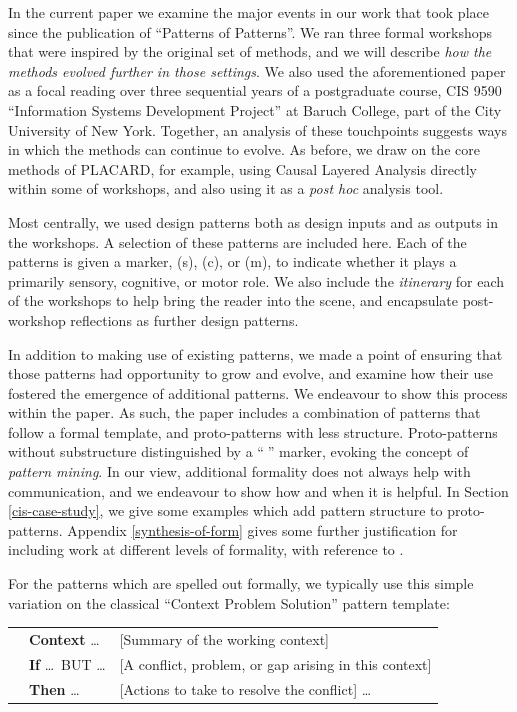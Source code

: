 \documentclass[acmlarge,timestamp]{acmart}
\begin{document}
In the current paper we examine the major events in our work that took
place since the publication of “Patterns of Patterns”.  We ran three
formal workshops that were inspired by the original set of methods,
and we will describe \emph{how the methods evolved further in those
settings}.  We also used the aforementioned paper as a focal reading
over three sequential years of a postgraduate course, CIS 9590
“Information Systems Development Project” at Baruch College, part of
the City University of New York.  Together, an analysis of these
touchpoints suggests ways in which the methods can continue to evolve.
As before, we draw on the core methods of PLACARD, for example, using
Causal Layered Analysis directly within some of workshops, and also
using it as a \emph{post hoc} analysis tool.

Most centrally, we used design patterns both as design inputs and as
outputs in the workshops.  A selection of these patterns are included
here.  Each of the patterns is given a marker, (s), (c), or (m), to
indicate whether it plays a primarily sensory, cognitive, or motor
role.  We also include the \emph{itinerary} for each of the workshops
to help bring the reader into the scene, and encapsulate post-workshop
reflections as further design patterns.

In addition to making use of existing patterns, we made a point of
ensuring that those patterns had opportunity to grow and evolve, and
examine how their use fostered the emergence of additional patterns.
We endeavour to show this process within the paper.  As such, the
paper includes a combination of patterns that follow a formal
template, and proto-patterns with less structure.  Proto-patterns
without substructure distinguished by a “💎” marker, evoking the
concept of \emph{pattern mining}.  In our view, additional formality
does not always help with communication, and we endeavour to show how
and when it is helpful.  In Section \ref{cis-case-study}, we give some
examples which add pattern structure to proto-patterns.  Appendix
\ref{synthesis-of-form} gives some further justification for including
work at different levels of formality, with reference to
\citet{alexander1964notes}.

For the patterns which are spelled out formally, we typically use this
simple variation on the classical “Context Problem Solution” pattern
template:
\smallskip

\begin{tabular}{lll}
\phantom{hellohellohello}& \textbf{Context} \ldots & {[}Summary of the working context{]}\\
\phantom{hellohellohello}&\textbf{If} \ldots\ BUT \ldots & {[}A conflict, problem, or gap arising in this context{]}  \\
\phantom{hellohellohello}&\textbf{Then} \ldots & {[}Actions to take to resolve the conflict{]} \ldots
\end{tabular}
\smallskip
\end{document}
